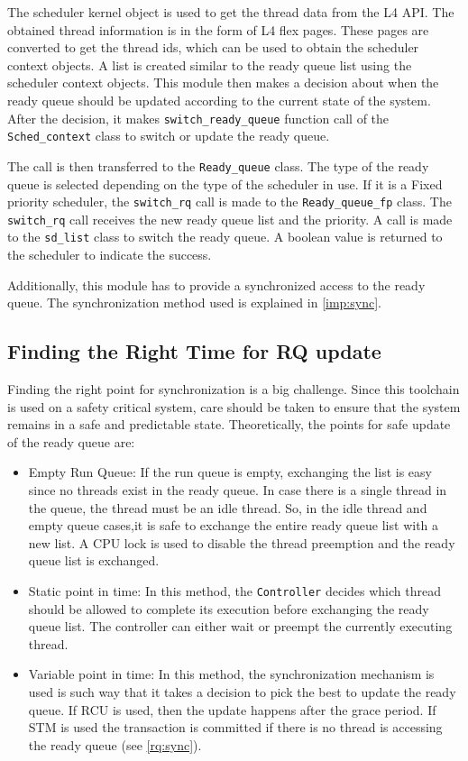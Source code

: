 The scheduler kernel object is used to get the thread data from the L4 API. The obtained thread information is in the form of L4 flex pages. These pages are converted to get the thread ids, which can be used to obtain the scheduler context objects. A list is created similar to the ready queue list using the scheduler context objects. This module then makes a decision about when the ready queue should be updated according to the current state of the system. After the decision, it makes \texttt{switch\_ready\_queue} function call of the \texttt{Sched\_context} class to switch or update the ready queue.

The call is then transferred to the \texttt{Ready\_queue} class. The type of the ready queue is selected depending on the type of the scheduler in use. If it is a Fixed priority scheduler, the \texttt{switch\_rq} call is made to the \texttt{Ready\_queue\_fp} class. The \texttt{switch\_rq} call receives the new ready queue list and the priority. A call is made to the \texttt{sd\_list} class to switch the ready queue. A boolean value is returned to the scheduler to indicate the success.

Additionally, this module has to provide a synchronized access to the ready queue. The synchronization method used is explained in \ref{imp:sync}. 

\subsection{Finding the Right Time for RQ update}
Finding the right point for synchronization is a big challenge. Since this toolchain is used on a safety critical system, care should be taken to ensure that the system remains in a safe and predictable state. Theoretically, the points for safe update of the ready queue are:

\begin{itemize}
\item Empty Run Queue: If the run queue is empty, exchanging the list is easy since no threads exist in the ready queue. In case there is a single thread in the queue, the thread must be an idle thread. So, in the idle thread and empty queue cases,it is safe to exchange the entire ready queue list with a new list. A CPU lock is used to disable the thread preemption and the ready queue list is exchanged.

\item Static point in time: In this method, the \texttt{Controller} decides which thread should be allowed to complete its execution before exchanging the ready queue list. The controller can either wait or preempt the currently executing thread.

\item Variable point in time: In this method, the synchronization mechanism is used is such way that it takes a decision to pick the best to update the ready queue. If RCU is used, then the update happens after the grace period. If STM is used the transaction is committed if there is no thread is accessing the ready queue (see \ref{rq:sync}).

\end{itemize}
